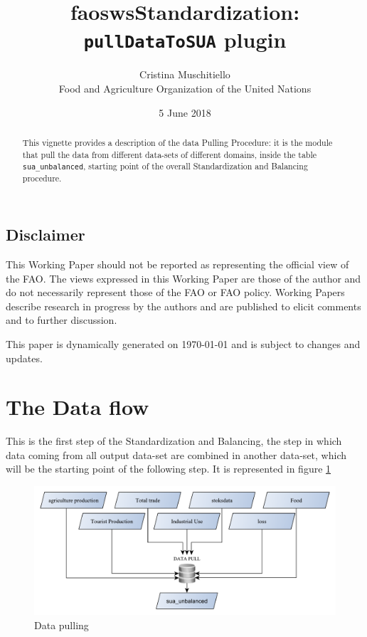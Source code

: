 \documentclass[]{article}
\title{faoswsStandardization:\\
\texttt{pullDataToSUA} plugin}
\author{Cristina Muschitiello\\
Food and Agriculture Organization of the United Nations}
\date{5 June 2018}
\begin{document}
\maketitle
\begin{abstract}
This vignette provides a description of the data Pulling Procedure: it
is the module that pull the data from different data-sets of different
domains, inside the table \texttt{sua\_unbalanced}, starting point of
the overall Standardization and Balancing procedure.
\end{abstract}

{
\setcounter{tocdepth}{4}
\tableofcontents
}
\newpage

\listoffigures

\subsection*{Disclaimer}\label{disclaimer}

This Working Paper should not be reported as representing the official
view of the FAO. The views expressed in this Working Paper are those of
the author and do not necessarily represent those of the FAO or FAO
policy. Working Papers describe research in progress by the authors and
are published to elicit comments and to further discussion.

This paper is dynamically generated on \today{} and is subject to
changes and updates.

\newpage

\section*{The Data flow}\label{the-data-flow}

This is the first step of the Standardization and Balancing, the step in
which data coming from all output data-set are combined in another
data-set, which will be the starting point of the following step. It is
represented in figure \ref{fig:f1}

\begin{figure}[H]

{\centering \includegraphics[width=1\linewidth]{images/pullData/01_pulldata} 

}

\caption{\label{fig:f1}Data pulling}\label{fig:f1}
\end{figure}
\end{document}
